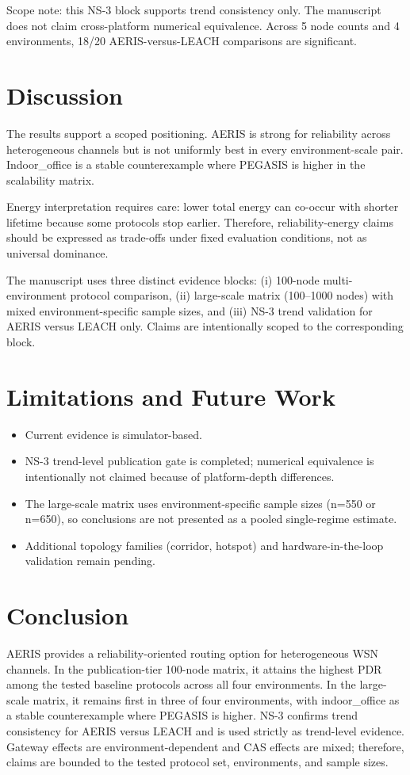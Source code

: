 \documentclass[sensors,article,submit,moreauthors,pdftex]{Definitions/mdpi}
\begin{document}
Scope note: this NS-3 block supports trend consistency only. The manuscript does not claim cross-platform numerical equivalence. Across 5 node counts and 4 environments, 18/20 AERIS-versus-LEACH comparisons are significant.

\section{Discussion}
The results support a scoped positioning. AERIS is strong for reliability across heterogeneous channels but is not uniformly best in every environment-scale pair. Indoor\_office is a stable counterexample where PEGASIS is higher in the scalability matrix.

Energy interpretation requires care: lower total energy can co-occur with shorter lifetime because some protocols stop earlier. Therefore, reliability-energy claims should be expressed as trade-offs under fixed evaluation conditions, not as universal dominance.

The manuscript uses three distinct evidence blocks: (i) 100-node multi-environment protocol comparison, (ii) large-scale matrix (100--1000 nodes) with mixed environment-specific sample sizes, and (iii) NS-3 trend validation for AERIS versus LEACH only. Claims are intentionally scoped to the corresponding block.

\section{Limitations and Future Work}
\begin{itemize}
\item Current evidence is simulator-based.
\item NS-3 trend-level publication gate is completed; numerical equivalence is intentionally not claimed because of platform-depth differences.
\item The large-scale matrix uses environment-specific sample sizes (n=550 or n=650), so conclusions are not presented as a pooled single-regime estimate.
\item Additional topology families (corridor, hotspot) and hardware-in-the-loop validation remain pending.
\end{itemize}

\section{Conclusion}
AERIS provides a reliability-oriented routing option for heterogeneous WSN channels. In the publication-tier 100-node matrix, it attains the highest PDR among the tested baseline protocols across all four environments. In the large-scale matrix, it remains first in three of four environments, with indoor\_office as a stable counterexample where PEGASIS is higher. NS-3 confirms trend consistency for AERIS versus LEACH and is used strictly as trend-level evidence. Gateway effects are environment-dependent and CAS effects are mixed; therefore, claims are bounded to the tested protocol set, environments, and sample sizes.
\end{document}

